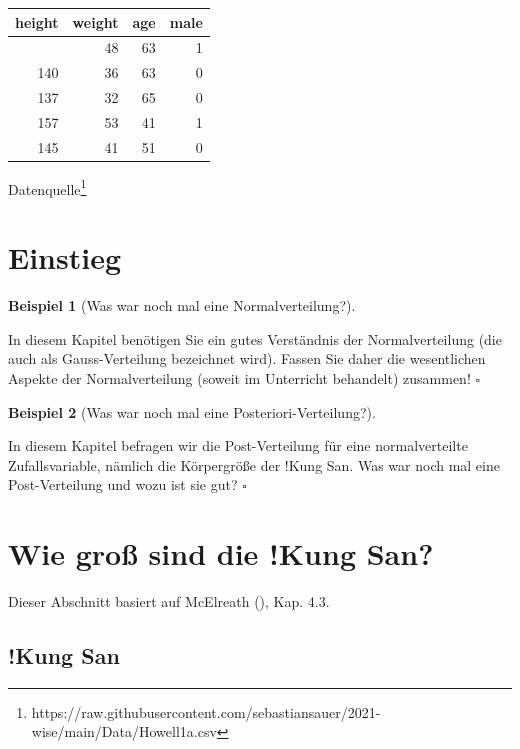 \documentclass[
  ngerman,
  letterpaper,
  twoside,
  open=any]{scrbook}
\newcounter{none} %
\theoremstyle{definition}
\newtheorem{example}{Beispiel}[chapter]
\theoremstyle{plain}
\theoremstyle{definition}
\theoremstyle{definition}
\theoremstyle{definition}
\newtheorem{example}{Beispiel}[chapter]
\theoremstyle{definition}
\theoremstyle{remark}
\begin{document}
{\def\LTcaptype{none} %
\begin{longtable}[]{@{}rrrr@{}}
\toprule\noalign{}
height & weight & age & male \\
\midrule\noalign{}
\endhead
\bottomrule\noalign{}
\endlastfoot
152 & 48 & 63 & 1 \\
140 & 36 & 63 & 0 \\
137 & 32 & 65 & 0 \\
157 & 53 & 41 & 1 \\
145 & 41 & 51 & 0 \\
\end{longtable}
}

Datenquelle\footnote{https://raw.githubusercontent.com/sebastiansauer/2021-wise/main/Data/Howell1a.csv}

\section{Einstieg}\label{einstieg}

\begin{example}[Was war noch mal eine
Normalverteilung?]\protect\hypertarget{exm-gauss}{}\label{exm-gauss}

In diesem Kapitel benötigen Sie ein gutes Verständnis der
Normalverteilung (die auch als Gauss-Verteilung bezeichnet wird). Fassen
Sie daher die wesentlichen Aspekte der Normalverteilung (soweit im
Unterricht behandelt) zusammen! \(\square\)

\end{example}

\begin{example}[Was war noch mal eine
Posteriori-Verteilung?]\protect\hypertarget{exm-post-gauss}{}\label{exm-post-gauss}

In diesem Kapitel befragen wir die Post-Verteilung für eine
normalverteilte Zufallsvariable, nämlich die Körpergröße der !Kung San.
Was war noch mal eine Post-Verteilung und wozu ist sie gut? \(\square\)

\end{example}

\section{Wie groß sind die !Kung
San?}\label{wie-grouxdf-sind-die-kung-san}

Dieser Abschnitt basiert auf McElreath
(), Kap. 4.3.

\subsection{!Kung San}\label{kung-san}
\end{document}
